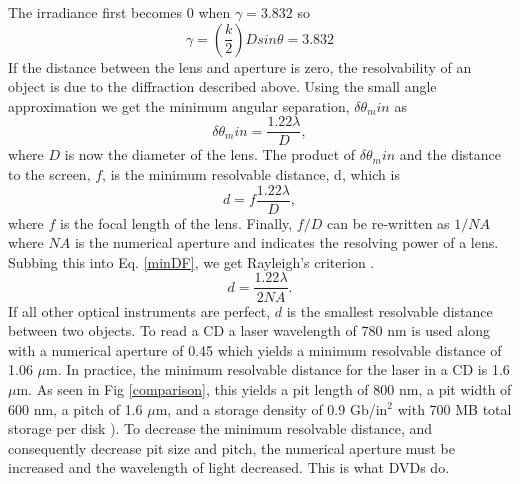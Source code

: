 \documentclass[ notitlepage, numerical, 11pt]{revtex4-1} %
\begin{document}
The irradiance first becomes 0 when $\gamma = 3.832$ \cite{optics} so 
\begin{equation}
\gamma = (\frac{k}{2})Dsin\theta = 3.832 
\label{gamma}
\end{equation} 
If the distance between the lens and aperture is zero, the resolvability of an object is due to the diffraction described above. Using the small angle approximation we get the minimum angular separation, $\delta\theta_min$ as 
\begin{equation}
\delta\theta_min = \frac{1.22\lambda}{D},
\label{thetaMin}
\end{equation} where $D$ is now the diameter of the lens. The product of $\delta\theta_min$ and the distance to the screen, $f$, is the minimum resolvable distance, d, which is
\begin{equation}
d = f\frac{1.22\lambda}{D},
\label{minDF}
\end{equation}
where $f$ is the focal length of the lens. Finally, $f/D$ can be re-written as $1/NA$ where $NA$ is the numerical aperture and indicates the resolving power of a lens. Subbing this into Eq. \ref{minDF}, we get Rayleigh's criterion \cite{memory}.
\begin{equation}
d = \frac{1.22\lambda}{2NA}.
\label{rayleigh}
\end{equation}
If all other optical instruments are perfect, $d$ is the smallest resolvable distance between two objects. To read a CD a laser wavelength of 780 nm is used along with a numerical aperture of 0.45 which yields a minimum resolvable distance of 1.06 $\mu$m. In practice, the minimum resolvable distance for the laser in a CD is 1.6 $\mu$m. As seen in Fig \ref{comparison}, this yields a pit length of 800 nm, a pit width of 600 nm, a pitch of 1.6 $\mu$m, and a storage density of 0.9 Gb/in$^2$ with 700 MB total storage per disk \cite{wikiHolo}). To decrease the minimum resolvable distance, and consequently decrease pit size and pitch, the numerical aperture must be increased and the wavelength of light decreased. This is what DVDs do.
\end{document}
